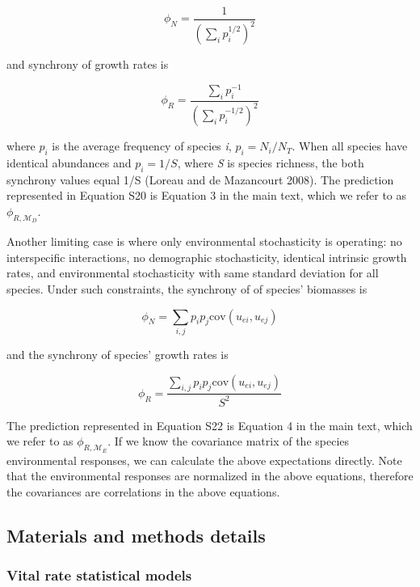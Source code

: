 \documentclass[12pt,]{article}
\begin{document}
\begin{equation}
\phi_N = \frac{1}{\left(\sum_i p_i^{1/2} \right)^2}
\end{equation}

\noindent and synchrony of growth rates is

\begin{equation}
\phi_R = \frac{\sum_i p_i^{-1}}{\left(\sum_i p_i^{-1/2} \right)^2}
\end{equation}

\noindent where \(p_i\) is the average frequency of species \emph{i},
\(p_i = N_i/N_T\). When all species have identical abundances and
\(p_i = 1/S\), where \emph{S} is species richness, the both synchrony
values equal 1/S (Loreau and {{de Mazancourt}} 2008). The prediction
represented in Equation S20 is Equation 3 in the main text, which we
refer to as \(\phi_{R,\mathcal{M}_D}\).

Another limiting case is where only environmental stochasticity is
operating: no interspecific interactions, no demographic stochasticity,
identical intrinsic growth rates, and environmental stochasticity with
same standard deviation for all species. Under such constraints, the
synchrony of of species' biomasses is

\begin{equation}
\phi_N = \sum_{i,j} p_i p_j \text{cov}(u_{ei}, u_{ej})
\end{equation}

\noindent{} and the synchrony of species' growth rates is

\begin{equation}
\phi_R = \frac{\sum_{i,j} p_i p_j \text{cov}(u_{ei}, u_{ej})}{S^2}
\end{equation}

\noindent The prediction represented in Equation S22 is Equation 4 in
the main text, which we refer to as \(\phi_{R,\mathcal{M}_E}\). If we
know the covariance matrix of the species environmental responses, we
can calculate the above expectations directly. Note that the
environmental responses are normalized in the above equations, therefore
the covariances are correlations in the above equations.

\newpage{}

\subsection{Materials and methods
details}\label{materials-and-methods-details}

\subsubsection{Vital rate statistical
models}\label{vital-rate-statistical-models}
\end{document}
